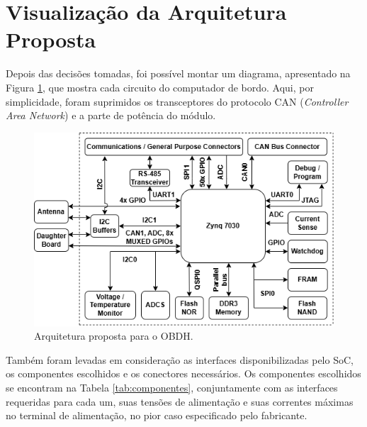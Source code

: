 \section{Visualização da Arquitetura Proposta}

Depois das decisões tomadas, foi possível montar um diagrama, apresentado na Figura \ref{fig:arq}, que mostra cada circuito do computador de bordo. Aqui, por simplicidade, foram suprimidos os transceptores do protocolo CAN (\textit{Controller Area Network}) e a parte de potência do módulo. 

\begin{figure}[H]
    \centering
    \includegraphics[scale=0.8]{images/arquitetura final.png}
    \caption{Arquitetura proposta para o OBDH.}
    \label{fig:arq}
\end{figure}

Também foram levadas em consideração as interfaces disponibilizadas pelo SoC, os componentes escolhidos e os conectores necessários. Os componentes escolhidos se encontram na Tabela \ref{tab:componentes}, conjuntamente com as interfaces requeridas para cada um, suas tensões de alimentação e suas correntes máximas no terminal de alimentação, no pior caso especificado pelo fabricante.

